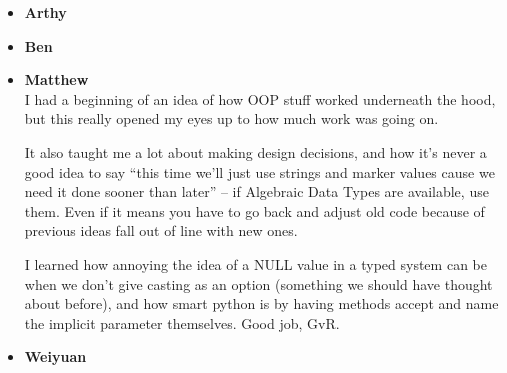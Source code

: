 
\begin{itemize}
\item {\bf Arthy}\\

\item {\bf Ben}\\

\item {\bf Matthew}\\
I had a beginning of an idea of how OOP stuff worked underneath the hood, but this really opened my eyes up to how much work was going on.

It also taught me a lot about making design decisions, and how it's never a good idea to say ``this time we'll just use strings and marker values cause we need it done sooner than later'' -- if Algebraic Data Types are available, use them. Even if it means you 
have to go back and adjust old code because of previous ideas fall out of line with new ones.

I learned how annoying the idea of a NULL value in a typed system can be when we don't give casting as an option (something we should have thought about before), and how smart python is by having methods accept and name the implicit parameter themselves. Good 
job, GvR.

\item {\bf Weiyuan}\\

\end{itemize}

